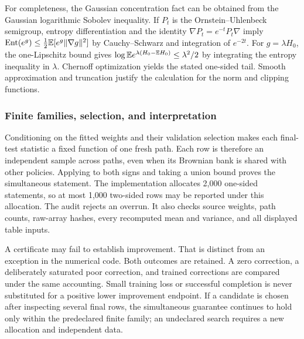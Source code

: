 For completeness, the Gaussian concentration fact can be obtained from the Gaussian logarithmic Sobolev inequality. If $P_t$ is the Ornstein--Uhlenbeck semigroup, entropy differentiation and the identity $\nabla P_t=e^{-t}P_t\nabla$ imply
$\operatorname{Ent}(e^g)\leq\tfrac12\mathbb E[e^g\|\nabla g\|^2]$ by Cauchy--Schwarz and integration of $e^{-2t}$. For $g=\lambda H_0$, the one-Lipschitz bound gives
$\log\mathbb E e^{\lambda(H_0-\mathbb E H_0)}\leq\lambda^2/2$ by integrating the entropy inequality in $\lambda$. Chernoff optimization yields the stated one-sided tail. Smooth approximation and truncation justify the calculation for the norm and clipping functions.

\subsubsection{Finite families, selection, and interpretation}
Conditioning on the fitted weights and their validation selection makes each final-test statistic a fixed function of one fresh path. Each row is therefore an independent sample across paths, even when its Brownian bank is shared with other policies. Applying \citet[Theorem~4]{maurer2009} to both signs and taking a union bound proves the simultaneous statement. The implementation allocates 2,000 one-sided statements, so at most 1,000 two-sided rows may be reported under this allocation. The audit rejects an overrun. It also checks source weights, path counts, raw-array hashes, every recomputed mean and variance, and all displayed table inputs.

A certificate may fail to establish improvement. That is distinct from an exception in the numerical code. Both outcomes are retained. A zero correction, a deliberately saturated poor correction, and trained corrections are compared under the same accounting. Small training loss or successful completion is never substituted for a positive lower improvement endpoint. If a candidate is chosen after inspecting several final rows, the simultaneous guarantee continues to hold only within the predeclared finite family; an undeclared search requires a new allocation and independent data.
